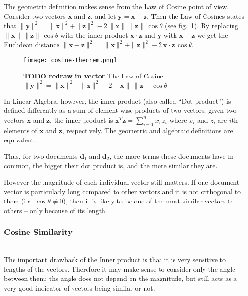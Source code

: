 The geometric definition makes sense from the Law of Cosine point of view.
Consider two vectors $\mathbf x$ and $\mathbf z$, and let
$\mathbf y = \mathbf x - \mathbf z$.
Then the Law of Cosines states that
$\| \mathbf y \|^2 = \| \mathbf x \|^2 + \| \mathbf z \|^2 - 2 \, \| \mathbf x \| \, \| \mathbf z\| \, \cos \theta$
(see fig.~\ref{fig:law-cosines}).
By replacing $\| \mathbf x \| \, \| \mathbf z\| \, \cos \theta$ with
the inner product $\mathbf x \cdot \mathbf z$ and $\mathbf y$ with $\mathbf x - \mathbf z$
we get the Euclidean distance
$\| \mathbf x - \mathbf z \|^2 = \| \mathbf x \|^2 + \| \mathbf z \|^2 - 2 \, \mathbf x \cdot \mathbf z \, \cos \theta$.


\begin{figure}[h]
\centering\texttt{[image: cosine-theorem.png]}
\caption{\textbf{TODO redraw in vector} The Law of Cosine:
$\| \mathbf y \|^2 = \| \mathbf x \|^2 + \| \mathbf z \|^2 - 2 \, \| \mathbf x \| \, \| \mathbf z\| \, \cos \theta$}
\label{fig:law-cosines}
\end{figure}


In Linear Algebra, however, the inner product (also called ``Dot product'')
is defined differently as a sum of element-wise products of two vectors:
given two vectors $\mathbf x$ and $\mathbf z$, the inner product is
$\mathbf x^T \mathbf z = \sum_{i = 1}^n x_i \, z_i$ where $x_i$ and $z_i$
are $i$th elements of $\mathbf x$ and $\mathbf z$, respectively.
The geometric and algebraic definitions are equivalent \cite{huges2013calculus}.


Thus, for two documents $\mathbf d_1$ and $\mathbf d_2$, the more terms
these documents have in common, the bigger their dot product is, and
the more similar they are.

However the magnitude of each individual vector still matters. If one
document vector is particularly long compared to other vectors and it is not
orthogonal to them (i.e. $\cos \theta \ne 0$), then it is likely to be
one of the most similar vectors to others -- only because of its length.


\subsubsection{Cosine Similarity} \ \\

The important drawback of the Inner product is that it is very sensitive to
lengths of the vectors. Therefore it may make sense to consider only the angle
between them: the angle does not depend on the magnitude, but still
acts as a very good indicator of vectors being similar or not.

